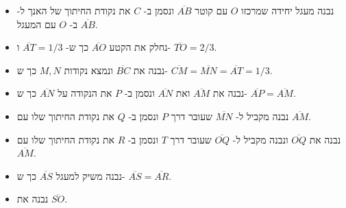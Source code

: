 \begin{itemize}
\item
נבנה מעגל יחידה שמרכזו
$O$
עם קוטר
$\overline{AB}$
ונסמן ב-%
$C$
את נקודת החיתוך של האנך ל-%
$\overline{AB}$
ב-%
$O$
עם המעגל.
\item
נחלק את הקטע
$\overline{AO}$
כך ש-%
$\overline{AT}=1/3$ 
ו-%
$\overline{TO}=2/3$.
\item
נבנה את
$\overline{BC}$
ונמצא נקודות
$M,N$
כך ש-%
$\overline{CM}=\overline{MN}=\overline{AT}=1/3$.
\item
נבנה את
$\overline{AM}$
ואת 
$\overline{AN}$
ונסמן ב-%
$P$
את הנקודה על
$\overline{AN}$
כך ש-%
$\overline{AP}=\overline{AM}$.
\item
נבנה מקביל ל-%
$\overline{MN}$
שעובר דרך
$P$
ונסמן ב-%
$Q$
את נקודת החיתוך שלו עם
$\overline{AM}$.
\item
נבנה את
$\overline{OQ}$
ונבנה מקביל ל-%
$\overline{OQ}$
שעובר דרך 
$T$
ונסמן ב-%
$R$
את נקודת החיתוך שלו עם
$\overline{AM}$.
\item
נבנה משיק למעגל
$\overline{AS}$
כך ש-%
$\overline{AS}=\overline{AR}$.
\item
נבנה את
$\overline{SO}$.
\end{itemize}
